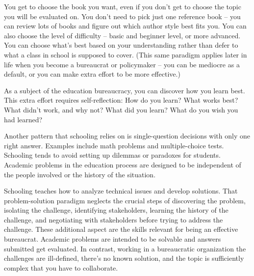 You get to choose the book you want, even if you don't get to choose the topic you will be evaluated on. You don't  need to pick just one reference book -- you can review lots of books and figure out which author style best fits you. You can also choose the level of difficulty -- basic and beginner level, or more advanced. 
%
%
You can choose what's best based on your understanding rather than defer to what a class in school is supposed to cover. (This same paradigm applies later in life when you become a bureaucrat or policymaker -- you can be mediocre as a default, or you can make extra effort to be more effective.)

As a subject of the education bureaucracy, you can discover how you learn best. 
%
%
This extra effort requires self-reflection: How do you learn? What works best? What didn't work, and why not? What did you learn? What do you wish you had learned?

Another pattern that schooling relies on is single-question decisions with only one right answer. Examples include math problems and multiple-choice tests. Schooling tends to avoid setting up dilemmas or paradoxes for students. Academic problems in the education process are designed to be independent of the people involved or the history of the situation. 









Schooling teaches how to analyze technical issues and develop solutions. That problem-solution paradigm neglects the crucial steps of discovering the problem, isolating the challenge, identifying stakeholders, learning the history of the challenge, and negotiating with stakeholders before trying to address the challenge.  These additional aspect are the skills relevant for being an effective bureaucrat. Academic problems are intended to be solvable and answers submitted get evaluated. In contrast, working in a bureaucratic organization the challenges are ill-defined, there's no known solution, and the topic is sufficiently complex that you have to collaborate.

